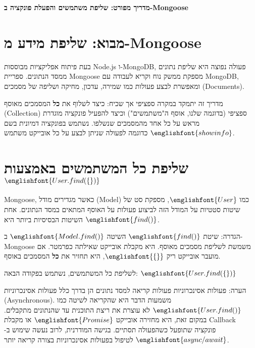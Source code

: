 \documentclass[12pt]{article}
\makeatletter
\renewcommand\tableofcontents{%
  \section*{\contentsname}%
  \@starttoc{toc}%
}
\makeatother
\begin{document}
\begin{center}
  \Huge\bfseries מדריך מפורט: שליפת משתמשים והפעלת פונקציה ב-Mongoose
\end{center}

\vspace{1cm}

\tableofcontents

\newpage

\section{מבוא: שליפת מידע מ-Mongoose}

בעת פיתוח אפליקציות מבוססות Node.js ו-MongoDB, פעולה נפוצה היא שליפת נתונים ממסד הנתונים. ספריית Mongoose מספקת ממשק נוח וקריא לעבודה עם MongoDB, ומאפשרת לבצע פעולות כמו שמירה, עדכון, מחיקה ושליפה של מסמכים (Documents).

מדריך זה יתמקד במקרה ספציפי אך שכיח: כיצד לשלוף את \textbf{כל} המסמכים מאוסף (Collection) ספציפי (בדוגמה שלנו, אוסף ה"משתמשים") וכיצד להפעיל פונקציה מוגדרת מראש על כל אחד מהמסמכים שנשלפו. נשתמש בפונקציה דמיונית בשם \(\englishfont{showinfo}\) כדוגמה לפעולה שניתן לבצע על כל אובייקט משתמש.

\section{שליפת כל המשתמשים באמצעות \(\englishfont{User.find(\{\})}\)}

Mongoose, כאשר מגדירים מודל (Model) כמו \(\englishfont{User}\), מספקת סט של שיטות סטטיות על המודל הזה לביצוע פעולות על האוסף המתאים במסד הנתונים. אחת השיטות הבסיסיות ביותר היא \(\englishfont{find()}\).

\begin{definitionBox}{הגדרה: שיטת \(\englishfont{find()}\)}
  השיטה \(\englishfont{Model.find()}\) ב-Mongoose משמשת לשליפת מסמכים מאוסף. היא מקבלת אובייקט שאילתה כפרמטר. אם מועבר אובייקט ריק \(\englishfont{\{\}}\), היא תחזיר את \textbf{כל} המסמכים באוסף.
\end{definitionBox}

לשליפת כל המשתמשים, נשתמש בפקודה הבאה:
\(\englishfont{User.find(\{\})}\)

\begin{remarkBox}{הערה: פעולות אסינכרוניות}
  פעולות קריאה למסד נתונים הן בדרך כלל פעולות אסינכרוניות (Asynchronous). משמעות הדבר היא שהקריאה לשיטה כמו \(\englishfont{User.find()}\) לא עוצרת את ריצת התוכנית עד שהנתונים מתקבלים. במקום זאת, היא מחזירה אובייקט \(\englishfont{Promise}\) או מקבלת Callback פונקציה שתופעל כשהפעולה תסתיים. בגישה המודרנית, לרוב נעשה שימוש ב-\(\englishfont{async/await}\) לטיפול בפעולות אסינכרוניות בצורה קריאה יותר.
\end{remarkBox}
\end{document}
